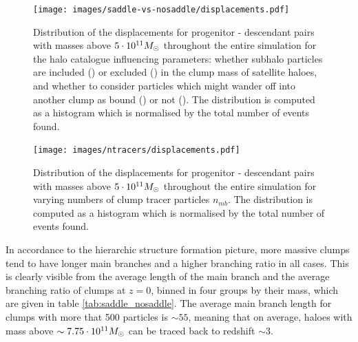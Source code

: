 \begin{figure}[H]
	\centering
		\texttt{[image: images/saddle-vs-nosaddle/displacements.pdf]}%
		\caption{
			Distribution of the displacements for progenitor - descendant pairs with masses above $5\cdot 10^{11}M_\odot$ throughout the entire simulation for the halo catalogue influencing parameters: 
			whether subhalo particles are included (\inc) or excluded (\exc) in the clump mass of satellite haloes, and whether to consider particles which might wander off into another clump as bound (\nosad) or not (\sad).
			The distribution is computed as a histogram which is normalised by the total number of events found.
		}%
		\label{fig:saddle_nosaddle_displacement}
	\endminipage%
	\hspace*{\fill}
		\centering
		\texttt{[image: images/ntracers/displacements.pdf]}%
		\caption{
			Distribution of the displacements for progenitor - descendant pairs with masses above $5\cdot 10^{11}M_\odot$ throughout the entire simulation for varying numbers of clump tracer particles $n_{mb}$.
			The distribution is computed as a histogram which is normalised by the total number of events found.
		}%
		\label{fig:ntracers_displacement}
	\endminipage
\end{figure}
















In accordance to the hierarchic structure formation picture, more massive clumps tend to have longer main branches and a higher branching ratio in all cases.
This is clearly visible from the average length of the main branch and the average branching ratio of clumps at $z=0$, binned in four groups by their mass, which are given in table \ref{tab:saddle_nosaddle}.
The average main branch length for clumps with more that 500 particles is $\sim 55$, meaning that on average, haloes with mass above $\sim 7.75 \cdot 10^{11} M_\odot$ can be traced back to redshift $\sim 3$.

